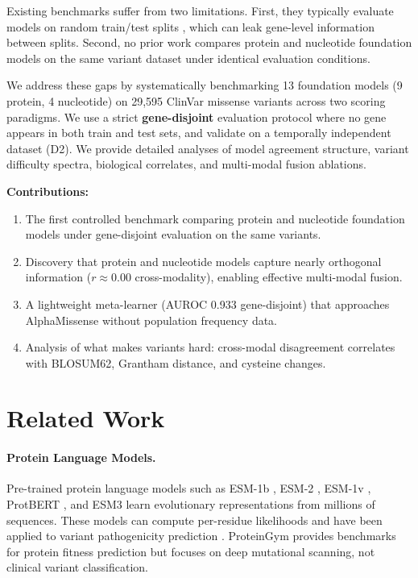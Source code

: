 \documentclass{article}
\begin{document}
Existing benchmarks suffer from two limitations. First, they typically evaluate models on random train/test splits \cite{promponas2020predicting}, which can leak gene-level information between splits. Second, no prior work compares protein and nucleotide foundation models on the same variant dataset under identical evaluation conditions.

We address these gaps by systematically benchmarking 13 foundation models (9 protein, 4 nucleotide) on 29,595 ClinVar missense variants across two scoring paradigms. We use a strict \textbf{gene-disjoint} evaluation protocol where no gene appears in both train and test sets, and validate on a temporally independent dataset (D2). We provide detailed analyses of model agreement structure, variant difficulty spectra, biological correlates, and multi-modal fusion ablations.

\textbf{Contributions:}
\begin{enumerate}
    \item The first controlled benchmark comparing protein and nucleotide foundation models under gene-disjoint evaluation on the same variants.
    \item Discovery that protein and nucleotide models capture nearly orthogonal information ($r \approx 0.00$ cross-modality), enabling effective multi-modal fusion.
    \item A lightweight meta-learner (AUROC 0.933 gene-disjoint) that approaches AlphaMissense without population frequency data.
    \item Analysis of what makes variants hard: cross-modal disagreement correlates with BLOSUM62, Grantham distance, and cysteine changes.
\end{enumerate}

\section{Related Work}

\paragraph{Protein Language Models.} Pre-trained protein language models such as ESM-1b \cite{li2023esm1b}, ESM-2 \cite{lin2023evolutionary}, ESM-1v \cite{meier2021language}, ProtBERT \cite{elnaggar2022prottrans}, and ESM3 \cite{esm3team2024esm3} learn evolutionary representations from millions of sequences. These models can compute per-residue likelihoods and have been applied to variant pathogenicity prediction \cite{promponas2020predicting, pei2021identifying}. ProteinGym provides benchmarks for protein fitness prediction but focuses on deep mutational scanning, not clinical variant classification.
\end{document}

